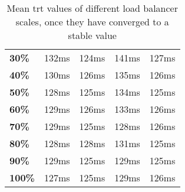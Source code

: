 \begin{table}[]
\begin{tabular}{lrrrr}
\textbf{30\%}                                                                & 132ms                                                           & 124ms                                                           & 141ms                                                           & 127ms                                                           \\
\textbf{40\%}                                                                & 130ms                                                           & 126ms                                                           & 135ms                                                           & 126ms                                                           \\
\textbf{50\%}                                                                & 128ms                                                           & 125ms                                                           & 134ms                                                           & 125ms                                                           \\
\textbf{60\%}                                                                & 129ms                                                           & 126ms                                                           & 133ms                                                           & 126ms                                                           \\
\textbf{70\%}                                                                & 129ms                                                           & 125ms                                                           & 128ms                                                           & 126ms                                                           \\
\textbf{80\%}                                                                & 128ms                                                           & 128ms                                                           & 131ms                                                           & 125ms                                                           \\
\textbf{90\%}                                                                & 129ms                                                           & 125ms                                                           & 129ms                                                           & 125ms                                                           \\
\textbf{100\%}                                                               & 127ms                                                           & 125ms                                                           & 129ms                                                           & 126ms                                                           \\ \hline
\end{tabular}
\caption{Mean \gls{trt} values of different load balancer scales, once they have converged to a stable value}
\label{tab:lb_scaling_converged_trt}
\end{table}